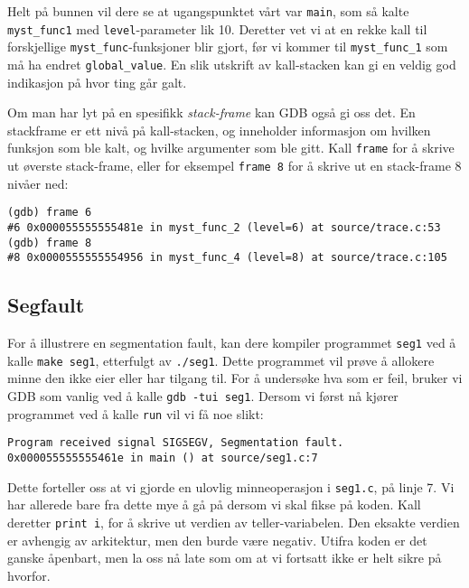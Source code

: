 Helt på bunnen vil dere se at ugangspunktet vårt var \verb|main|, som så kalte \verb|myst_func1| med \verb|level|-parameter lik 10. Deretter vet vi at en rekke kall til forskjellige \verb|myst_func|-funksjoner blir gjort, før vi kommer til \verb|myst_func_1| som må ha endret \verb|global_value|. En slik utskrift av kall-stacken kan gi en veldig god indikasjon på hvor ting går galt.


Om man har lyt på en spesifikk \textit{stack-frame} kan GDB også gi oss det. En stackframe er ett nivå på kall-stacken, og inneholder informasjon om hvilken funksjon som ble kalt, og hvilke argumenter som ble gitt. Kall \verb|frame| for å skrive ut øverste stack-frame, eller for eksempel \verb|frame 8| for å skrive ut en stack-frame 8 nivåer ned:

\begin{lstlisting}[mathescape=true,keywordstyle=\color{black}]
(gdb) frame 6
#6 0x000055555555481e in myst_func_2 (level=6) at source/trace.c:53
(gdb) frame 8
#8 0x0000555555554956 in myst_func_4 (level=8) at source/trace.c:105
\end{lstlisting}


\subsection{Segfault}

For å illustrere en segmentation fault, kan dere kompiler programmet \verb|seg1| ved å kalle \verb|make seg1|, etterfulgt av \verb|./seg1|. Dette programmet vil prøve å allokere minne den ikke eier eller har tilgang til. For å undersøke hva som er feil, bruker vi GDB som vanlig ved å kalle \verb|gdb -tui seg1|. Dersom vi først nå kjører programmet ved å kalle \verb|run| vil vi få noe slikt:

\begin{lstlisting}[mathescape=true,keywordstyle=\color{black}]
Program received signal SIGSEGV, Segmentation fault.
0x000055555555461e in main () at source/seg1.c:7
\end{lstlisting}


Dette forteller oss at vi gjorde en ulovlig minneoperasjon i \verb|seg1.c|, på linje 7. Vi har allerede bare fra dette mye å gå på dersom vi skal fikse på koden. Kall deretter \verb|print i|, for å skrive ut verdien av teller-variabelen. Den eksakte verdien er avhengig av arkitektur, men den burde være negativ. Utifra koden er det ganske åpenbart, men la oss nå late som om at vi fortsatt ikke er helt sikre på hvorfor.


